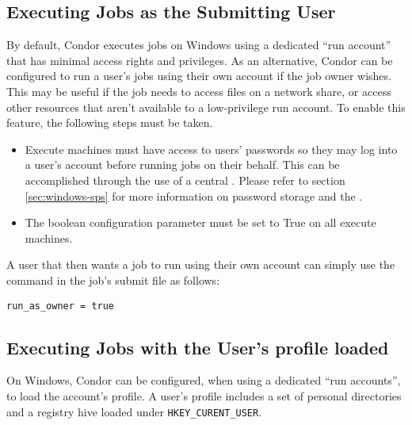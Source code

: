 \subsection{\label{sec:windows-run-as-owner}Executing Jobs as the Submitting User}

By default, Condor executes jobs on Windows using a dedicated ``run
account'' that has minimal access rights and privileges.  As an
alternative, Condor can be configured to run a user's jobs using their
own account if the job owner wishes. This may be useful if the job
needs to access files on a network share, or access other resources
that aren't available to a low-privilege run account. To enable this
feature, the following steps must be taken.

\begin{itemize}
\item Execute machines must have access to users' passwords so they
      may log into a user's account before running jobs on their
      behalf.  This can be accomplished through the use of a central
      . Please refer to section \ref{sec:windows-sps}
      for more information on password storage and the .
\item The boolean configuration parameter
       must be set to True on all
      execute machines.
\end{itemize}

A user that then wants a job to run using their own account can simply
use the  command in the job's submit file as
follows:
\begin{verbatim}
run_as_owner = true
\end{verbatim}

\subsection{\label{sec:windows-load-profile}Executing Jobs with the User's profile loaded}

On Windows, Condor can be configured, when using a dedicated ``run accounts'', 
to load the account's profile.  A user's profile includes a set of personal 
directories and a registry hive loaded under \texttt{HKEY\_CURENT\_USER}.

